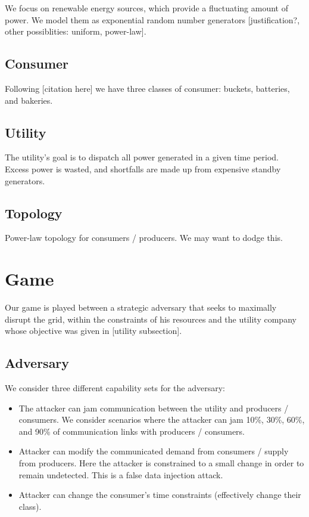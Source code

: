 \documentclass{article}
\begin{document}
\begin{multicols}{2}
We focus on renewable energy sources, which provide a fluctuating amount of power.  We model them as exponential random 
number generators [justification?, other possiblities: uniform, power-law].

\subsection{Consumer}

Following [citation here] we have three classes of consumer: buckets, batteries, and bakeries.  

\subsection{Utility}

The utility's goal is to dispatch all power generated in a given time period.  Excess power is wasted, and shortfalls are 
made up from expensive standby generators.  

\subsection{Topology}

Power-law topology for consumers / producers.  We may want to dodge this.

\section{Game}

Our game is played between a strategic adversary that seeks to maximally disrupt the grid, within the constraints of his
resources and the utility company whose objective was given in [utility subsection].  

\subsection{Adversary}

We consider three different capability sets for the adversary:

\begin{itemize}
\item The attacker can jam communication between the utility and producers / consumers.  We consider scenarios where the
attacker can jam 10\%, 30\%, 60\%, and 90\% of communication links with producers / consumers.
\item Attacker can modify the communicated demand from consumers / supply from producers.  Here the attacker is constrained
to a small change in order to remain undetected. This is a false data injection attack.
\item  Attacker can change the consumer's time constraints (effectively change their class).
\end{itemize}


\end{multicols}
\end{document}
